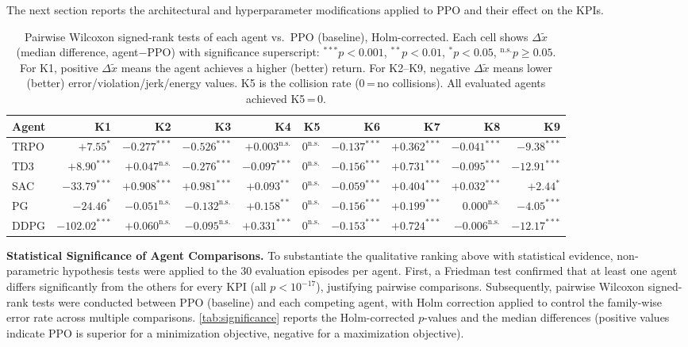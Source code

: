 \documentclass{ieeeaccess}
\begin{document}
The next section reports the architectural and hyperparameter modifications applied to PPO and their
effect on the KPIs.

\begin{table}[!t]
\centering
\caption{Pairwise Wilcoxon signed-rank tests of each agent vs.\ PPO (baseline), Holm-corrected.
  Each cell shows $\Delta\tilde{x}$ (median difference, agent$-$PPO) with significance superscript:
  ${}^{***}p<0.001$, ${}^{**}p<0.01$, ${}^{*}p<0.05$, ${}^{\mathrm{n.s.}}p\geq0.05$.
  For K1, positive $\Delta\tilde{x}$ means the agent achieves a higher (better) return.
  For K2--K9, negative $\Delta\tilde{x}$ means lower (better) error/violation/jerk/energy values.
  K5 is the collision rate (0\,=\,no collisions). All evaluated agents achieved K5\,=\,0.}
\label{tab:significance}
\renewcommand{\arraystretch}{1.3}
\setlength{\tabcolsep}{5pt}
\footnotesize
\begin{tabular}{l *{9}{r}}
\toprule
\textbf{Agent} & \textbf{K1} & \textbf{K2} & \textbf{K3} & \textbf{K4} & \textbf{K5} & \textbf{K6} & \textbf{K7} & \textbf{K8} & \textbf{K9} \\
\midrule
TRPO & $+7.55^{*}$    & $-0.277^{***}$ & $-0.526^{***}$ & $+0.003^{\mathrm{n.s.}}$ & $0^{\mathrm{n.s.}}$    & $-0.137^{***}$ & $+0.362^{***}$ & $-0.041^{***}$ & $-9.38^{***}$  \\
TD3  & $+8.90^{***}$  & $+0.047^{\mathrm{n.s.}}$ & $-0.276^{***}$ & $-0.097^{***}$ & $0^{\mathrm{n.s.}}$    & $-0.156^{***}$ & $+0.731^{***}$ & $-0.095^{***}$ & $-12.91^{***}$ \\
SAC  & $-33.79^{***}$ & $+0.908^{***}$ & $+0.981^{***}$ & $+0.093^{**}$  & $0^{\mathrm{n.s.}}$   & $-0.059^{***}$ & $+0.404^{***}$ & $+0.032^{***}$ & $+2.44^{*}$    \\
PG   & $-24.46^{*}$   & $-0.051^{\mathrm{n.s.}}$ & $-0.132^{\mathrm{n.s.}}$ & $+0.158^{**}$  & $0^{\mathrm{n.s.}}$    & $-0.156^{***}$ & $+0.199^{***}$ & $0.000^{\mathrm{n.s.}}$  & $-4.05^{***}$  \\
DDPG & $-102.02^{***}$& $+0.060^{\mathrm{n.s.}}$ & $-0.095^{\mathrm{n.s.}}$ & $+0.331^{***}$ & $0^{\mathrm{n.s.}}$   & $-0.153^{***}$ & $+0.724^{***}$ & $-0.006^{\mathrm{n.s.}}$ & $-12.17^{***}$ \\
\bottomrule
\end{tabular}
\end{table}

\textbf{Statistical Significance of Agent Comparisons.}
To substantiate the qualitative ranking above with statistical evidence, non-parametric
hypothesis tests were applied to the 30 evaluation episodes per agent.
First, a Friedman test confirmed that at least one agent differs significantly from the
others for
every KPI (all $p < 10^{-17}$), justifying pairwise comparisons.
Subsequently, pairwise Wilcoxon signed-rank tests were conducted between PPO (baseline) and each
competing agent, with Holm correction applied to control the family-wise error rate across
multiple comparisons.
\autoref{tab:significance} reports the Holm-corrected $p$-values and the median differences %
(positive values indicate PPO is superior for a minimization objective, negative for a
maximization objective).
\end{document}
